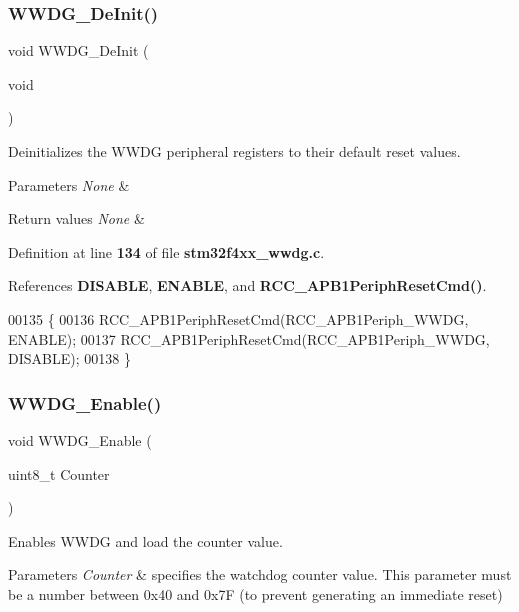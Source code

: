 \subsubsection{W\+W\+D\+G\+\_\+\+De\+Init()}
{\footnotesize\ttfamily void W\+W\+D\+G\+\_\+\+De\+Init (\begin{DoxyParamCaption}\item[{void}]{ }\end{DoxyParamCaption})}



Deinitializes the W\+W\+DG peripheral registers to their default reset values. 


\begin{DoxyParams}{Parameters}
{\em None} & \\
\hline
\end{DoxyParams}

\begin{DoxyRetVals}{Return values}
{\em None} & \\
\hline
\end{DoxyRetVals}


Definition at line \textbf{ 134} of file \textbf{ stm32f4xx\+\_\+wwdg.\+c}.



References \textbf{ D\+I\+S\+A\+B\+LE}, \textbf{ E\+N\+A\+B\+LE}, and \textbf{ R\+C\+C\+\_\+\+A\+P\+B1\+Periph\+Reset\+Cmd()}.


\begin{DoxyCode}
00135 \{
00136   RCC_APB1PeriphResetCmd(RCC_APB1Periph_WWDG, ENABLE);
00137   RCC_APB1PeriphResetCmd(RCC_APB1Periph_WWDG, DISABLE);
00138 \}
\end{DoxyCode}
\mbox{\label{group__WWDG_ga10dc2554d0b504b5472e3ecf0f02a9e6}} 
\subsubsection{W\+W\+D\+G\+\_\+\+Enable()}
{\footnotesize\ttfamily void W\+W\+D\+G\+\_\+\+Enable (\begin{DoxyParamCaption}\item[{uint8\+\_\+t}]{Counter }\end{DoxyParamCaption})}



Enables W\+W\+DG and load the counter value. 


\begin{DoxyParams}{Parameters}
{\em Counter} & specifies the watchdog counter value. This parameter must be a number between 0x40 and 0x7F (to prevent generating an immediate reset) \\
\hline
\end{DoxyParams}


